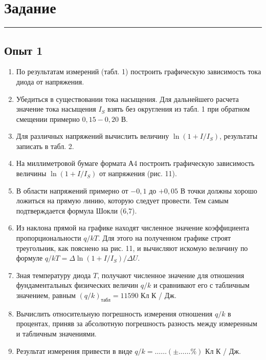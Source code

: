 \documentclass[a4paper, 14pt]{extarticle}
\begin{document}


\section*{Задание}\vspace{-20pt}\rule{\linewidth}{0.1mm}

\subsection*{Опыт 1}

\begin{enumerate}
    \item По результатам измерений (табл. 1) построить графическую зависимость тока диода от напряжения.
    \item Убедиться в существовании тока насыщения. Для дальнейшего расчета значение тока насыщения $I_{S}$ взять без округления из табл. 1 при обратном смещении примерно $0,15-0,20$ В.
    \item Для различных напряжений вычислить величину $\ln \left(1+I / I_{S}\right)$, результаты записать в табл. 2.
    \item На миллиметровой бумаге формата А4 построить графическую зависимость величины $\ln \left(1+I / I_{S}\right)$ от напряжения (рис. 11).
    \item В области напряжений примерно от $-0,1$ до $+0,05$ В точки должны хорошо ложиться на прямую линию, которую следует провести. Тем самым подтверждается формула Шокли (6,7).
    \item Из наклона прямой на графике находят численное значение коэффициента пропорциональности $q / k T$. Для этого на полученном графике строят треугольник, как пояснено на рис. 11, и вычисляют искомую величину по формуле $q / k T = \Delta \ln \left(1+I / I_{S}\right) / \Delta U$.
    \item Зная температуру диода $T$, получают численное значение для отношения фундаментальных физических величин $q / k$ и сравнивают его с табличным значением, равным $(q / k)_{\text{табл}} = 11590$ Кл К / Дж.
    \item Вычислить относительную погрешность измерения отношения $q / k$ в процентах, приняв за абсолютную погрешность разность между измеренным и табличным значениями.
    \item Результат измерения привести в виде $q / k = \ldots \ldots (\pm \ldots \ldots \%)$ Кл К / Дж.
\end{enumerate}
\end{document}
